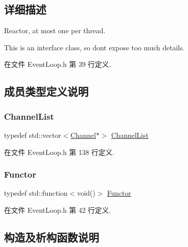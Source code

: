 \subsection{详细描述}
Reactor, at most one per thread.

This is an interface class, so don\textquotesingle{}t expose too much details. 

在文件 Event\+Loop.\+h 第 39 行定义.



\subsection{成员类型定义说明}
\mbox{\label{classmuduo_1_1net_1_1EventLoop_a0b74248ffee6df294563618187b52404}} 
\subsubsection{\texorpdfstring{Channel\+List}{ChannelList}}
{\footnotesize\ttfamily typedef std\+::vector$<$\hyperlink{classmuduo_1_1net_1_1Channel}{Channel}$\ast$$>$ \hyperlink{classmuduo_1_1net_1_1EventLoop_a0b74248ffee6df294563618187b52404}{Channel\+List}\hspace{0.3cm}{\ttfamily [private]}}



在文件 Event\+Loop.\+h 第 138 行定义.

\mbox{\label{classmuduo_1_1net_1_1EventLoop_a322d335989ca5098875638110aafba84}} 
\subsubsection{\texorpdfstring{Functor}{Functor}}
{\footnotesize\ttfamily typedef std\+::function$<$void()$>$ \hyperlink{classmuduo_1_1net_1_1EventLoop_a322d335989ca5098875638110aafba84}{Functor}}



在文件 Event\+Loop.\+h 第 42 行定义.



\subsection{构造及析构函数说明}
\mbox{\label{classmuduo_1_1net_1_1EventLoop_a2bb4ef53c2b77f2313fe0db9fc952450}} 
